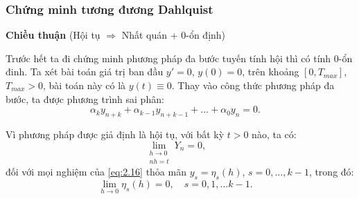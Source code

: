 

\subsubsection{Chứng minh tương đương Dahlquist}
\textbf{Chiều thuận} (Hội tụ $\Longrightarrow$ Nhất quán + $0$-ổn định)

Trước hết ta đi chứng minh phương pháp đa bước tuyến tính hội thì có tính $0$-ổn đinh. Ta xét bài toán giá trị ban đầu $y' = 0$, $y(0) = 0$, trên khoảng $[0, T_{max}]$, $T_{max} > 0$, bài toán này có là $y(t) \equiv 0$. Thay vào công thức phương pháp đa bước, ta được phương trình sai phân:
\begin{equation}
    \alpha_k y_{n+k} + \alpha_{k-1} y_{n+k-1} + \dots + \alpha_0 y_n = 0 . \quad \tag{2.16} \label{eq:2.16}
\end{equation}

Vì phương pháp được giả định là hội tụ, với bất kỳ $t > 0$ nào, ta có:
\begin{equation}
    \lim_{\substack{h \to 0 \\ nh=t}} Y_n = 0 , \quad \tag{2.17} \label{eq:2.17}
\end{equation}
đối với mọi nghiệm của \eqref{eq:2.16} thỏa mãn $y_s = \eta_s(h)$, $s = 0, \dots, k - 1$, trong đó:
\begin{equation}
    \lim_{h \to 0} \eta_s(h) = 0 , \quad s = 0, 1, \dots k - 1 . \quad \tag{2.18} \label{eq:2.18}
\end{equation}
    

